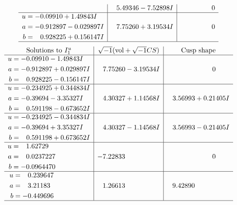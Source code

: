 \documentclass[1p]{elsarticle_modified}
\theoremstyle{definition}
\newcommand{\I}{\sqrt{-1}}
\begin{document}
$$\begin{array}{c|c|c}
 & \phantom{-}5.49346 - 7.52898 I & \phantom{-0.000000 } 0 \\ \hline\begin{aligned}
u &= -0.09910 + 1.49843 I \\
a &= -0.912897 - 0.029897 I \\
b &= \phantom{-}0.928225 + 0.156147 I\end{aligned}
 & \phantom{-}7.75260 + 3.19534 I & \phantom{-0.000000 } 0\\
 \hline 
 \end{array}$$\newpage$$\begin{array}{c|c|c}  
\text{Solutions to }I^u_{1}& \I (\text{vol} + \sqrt{-1}CS) & \text{Cusp shape}\\
 \hline 
\begin{aligned}
u &= -0.09910 - 1.49843 I \\
a &= -0.912897 + 0.029897 I \\
b &= \phantom{-}0.928225 - 0.156147 I\end{aligned}
 & \phantom{-}7.75260 - 3.19534 I & \phantom{-0.000000 } 0 \\ \hline\begin{aligned}
u &= -0.234925 + 0.344834 I \\
a &= -0.39694 - 3.35327 I \\
b &= \phantom{-}0.591198 - 0.673652 I\end{aligned}
 & \phantom{-}4.30327 + 1.14568 I & \phantom{-}3.56993 + 0.21405 I \\ \hline\begin{aligned}
u &= -0.234925 - 0.344834 I \\
a &= -0.39694 + 3.35327 I \\
b &= \phantom{-}0.591198 + 0.673652 I\end{aligned}
 & \phantom{-}4.30327 - 1.14568 I & \phantom{-}3.56993 - 0.21405 I \\ \hline\begin{aligned}
u &= \phantom{-}1.62729\phantom{ +0.000000I} \\
a &= \phantom{-}0.0237227\phantom{ +0.000000I} \\
b &= -0.0964470\phantom{ +0.000000I}\end{aligned}
 & -7.22833\phantom{ +0.000000I} & \phantom{-0.000000 } 0 \\ \hline\begin{aligned}
u &= \phantom{-}0.239647\phantom{ +0.000000I} \\
a &= \phantom{-}3.21183\phantom{ +0.000000I} \\
b &= -0.449696\phantom{ +0.000000I}\end{aligned}
 & \phantom{-}1.26613\phantom{ +0.000000I} & \phantom{-}9.42890\phantom{ +0.000000I}\\
 \hline 
 \end{array}$$\newpage\newpage\renewcommand{\arraystretch}{1}
\end{document}
